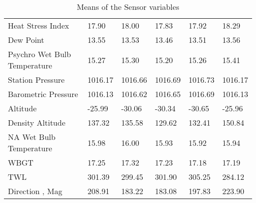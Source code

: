 \documentclass{article}
\begin{document}
\begin{table}[H]
{\begin{tabular}{l|lllll}
Heat Stress Index            & 17.90             & 18.00             & 17.83             & 17.92             & 18.29             \\
Dew Point                    & 13.55             & 13.53             & 13.46             & 13.51             & 13.56             \\
Psychro Wet Bulb Temperature & 15.27             & 15.30             & 15.20             & 15.26             & 15.41             \\
Station Pressure             & 1016.17           & 1016.66           & 1016.69           & 1016.73           & 1016.17           \\
Barometric Pressure          & 1016.13           & 1016.62           & 1016.65           & 1016.69           & 1016.13           \\
Altitude                     & -25.99            & -30.06            & -30.34            & -30.65            & -25.96            \\
Density Altitude             & 137.32            & 135.58            & 129.62            & 132.41            & 150.84            \\
NA Wet Bulb Temperature      & 15.98             & 16.00             & 15.93             & 15.92             & 15.94             \\
WBGT                         & 17.25             & 17.32             & 17.23             & 17.18             & 17.19             \\
TWL                          & 301.39            & 299.45            & 301.90            & 305.25            & 284.12            \\
Direction ‚ Mag              & 208.91            & 183.22            & 183.08            & 197.83            & 223.90           
\end{tabular}%
}
\caption{Means of the Sensor variables }
\label{tab:my-table}
\end{table}
\end{document}
